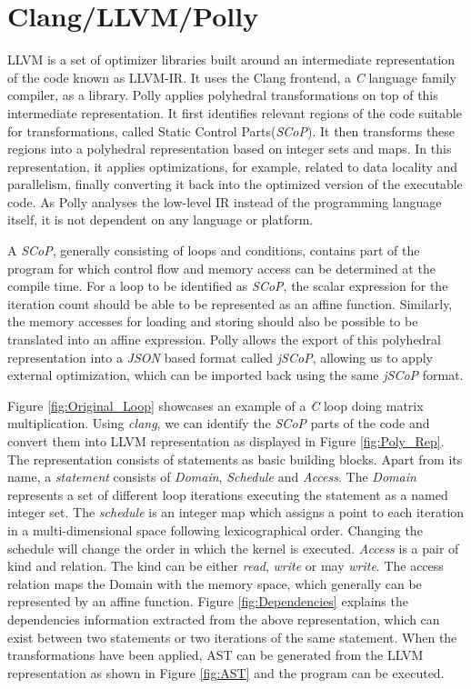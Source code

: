 \documentclass[logo,msc]{infthesis}           %
\begin{document}
\section{Clang/LLVM/Polly}

LLVM is a set of optimizer libraries built around an intermediate representation of the code known as LLVM-IR. It uses the Clang frontend, a \textit{C} language family compiler, as a library.
Polly applies polyhedral transformations on top of this intermediate representation\cite{grosser2011polly}. It first identifies relevant regions of the code suitable for transformations, called Static Control Parts(\textit{SCoP})\cite{grosser2011polly}. It then transforms these regions into a polyhedral representation based on integer sets and maps. In this representation, it applies optimizations, for example, related to data locality and parallelism, finally converting it back into the optimized version of the executable code. As Polly analyses the low-level IR instead of the programming language itself, it is not dependent on any language or platform.

A \textit{SCoP}, generally consisting of loops and conditions, contains part of the program for which control flow and memory access can be determined at the compile time. For a loop to be identified as \textit{SCoP}, the scalar expression for the iteration count should be able to be represented as an affine function. Similarly, the memory accesses for loading and storing should also be possible to be translated into an affine expression. Polly allows the export of this polyhedral representation into a \textit{JSON} based format called \textit{jSCoP},
allowing us to apply external optimization, which can be imported back using the same \textit{jSCoP} format.

 Figure \ref{fig:Original_Loop} showcases an example of a \textit{C} loop doing matrix multiplication. Using \textit{clang}, we can identify the \textit{SCoP} parts of the code and convert them into LLVM representation as displayed in Figure \ref{fig:Poly_Rep}. The representation consists of statements as basic building blocks. Apart from its name, a \textit{statement} consists of \textit{Domain}, \textit{Schedule} and \textit{Access}. The \textit{Domain} represents a set of different loop iterations executing the statement as a named integer set. The \textit{schedule} is an integer map which assigns a point to each iteration in a multi-dimensional space following lexicographical order. Changing the schedule will change the order in which the kernel is executed. \textit{Access} is a pair of kind and relation. The kind can be either \textit{read}, \textit{write} or may \textit{write}. The access relation maps the Domain with the memory space, which generally can be represented by an affine function. Figure \ref{fig:Dependencies} explains the dependencies information extracted from the above representation, which can exist between two statements or two iterations of the same statement. When the transformations have been applied, AST can be generated from the LLVM representation as shown in Figure \ref{fig:AST} and the program can be executed\cite{10.1145/2743016}.
\end{document}
